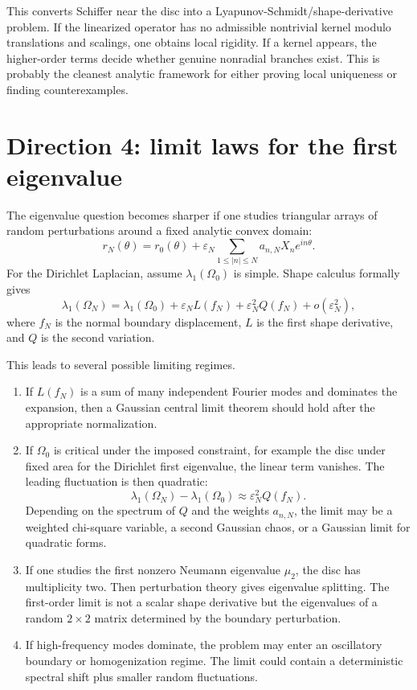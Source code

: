 \documentclass[11pt]{article}
\newcommand{\Om}{\Omega}
\newcommand{\eps}{\varepsilon}
\newcommand{\1}{\mathbf 1}
\begin{document}
This converts Schiffer near the disc into a Lyapunov-Schmidt/shape-derivative
problem. If the linearized operator has no admissible nontrivial kernel modulo
translations and scalings, one obtains local rigidity. If a kernel appears,
the higher-order terms decide whether genuine nonradial branches exist. This is
probably the cleanest analytic framework for either proving local uniqueness or
finding counterexamples.

\section*{Direction 4: limit laws for the first eigenvalue}

The eigenvalue question becomes sharper if one studies triangular arrays of
random perturbations around a fixed analytic convex domain:
\[
    r_N(\theta)
    =
    r_0(\theta)
    +
    \eps_N
    \sum_{1\le |n|\le N} a_{n,N}X_n e^{in\theta}.
\]
For the Dirichlet Laplacian, assume $\lambda_1(\Om_0)$ is simple. Shape calculus
formally gives
\[
    \lambda_1(\Om_N)
    =
    \lambda_1(\Om_0)
    +
    \eps_N L(f_N)
    +
    \eps_N^2 Q(f_N)
    +
    o(\eps_N^2),
\]
where $f_N$ is the normal boundary displacement, $L$ is the first shape
derivative, and $Q$ is the second variation.

This leads to several possible limiting regimes.
\begin{enumerate}[leftmargin=*]
    \item If $L(f_N)$ is a sum of many independent Fourier modes and dominates
    the expansion, then a Gaussian central limit theorem should hold after the
    appropriate normalization.

    \item If $\Om_0$ is critical under the imposed constraint, for example the
    disc under fixed area for the Dirichlet first eigenvalue, the linear term
    vanishes. The leading fluctuation is then quadratic:
    \[
        \lambda_1(\Om_N)-\lambda_1(\Om_0)
        \approx \eps_N^2 Q(f_N).
    \]
    Depending on the spectrum of $Q$ and the weights $a_{n,N}$, the limit may
    be a weighted chi-square variable, a second Gaussian chaos, or a Gaussian
    limit for quadratic forms.

    \item If one studies the first nonzero Neumann eigenvalue $\mu_2$, the disc
    has multiplicity two. Then perturbation theory gives eigenvalue splitting.
    The first-order limit is not a scalar shape derivative but the eigenvalues
    of a random $2\times2$ matrix determined by the boundary perturbation.

    \item If high-frequency modes dominate, the problem may enter an oscillatory
    boundary or homogenization regime. The limit could contain a deterministic
    spectral shift plus smaller random fluctuations.
\end{enumerate}
\end{document}
